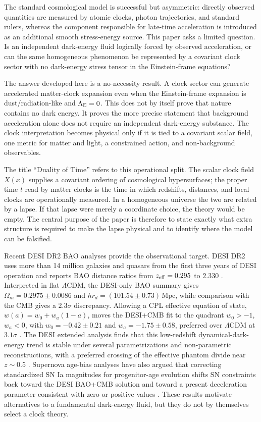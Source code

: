 \documentclass[aps,prd,reprint,nofootinbib,superscriptaddress,longbibliography]{revtex4-2}
\newcommand{\LCDM}{$\Lambda$CDM}
\begin{document}
The standard cosmological model is successful but asymmetric: directly observed quantities are measured by atomic clocks, photon trajectories, and standard rulers, whereas the component responsible for late-time acceleration is introduced as an additional smooth stress-energy source.  This paper asks a limited question.  Is an independent dark-energy fluid logically forced by observed acceleration, or can the same homogeneous phenomenon be represented by a covariant clock sector with no dark-energy stress tensor in the Einstein-frame equations?

The answer developed here is a no-necessity result.  A clock sector can generate accelerated matter-clock expansion even when the Einstein-frame expansion is dust/radiation-like and $\Lambda_{\rm E}=0$.  This does not by itself prove that nature contains no dark energy.  It proves the more precise statement that background acceleration alone does not require an independent dark-energy substance.  The clock interpretation becomes physical only if it is tied to a covariant scalar field, one metric for matter and light, a constrained action, and non-background observables.

The title ``Duality of Time'' refers to this operational split.  The scalar clock field $X(x)$ supplies a covariant ordering of cosmological hypersurfaces; the proper time $t$ read by matter clocks is the time in which redshifts, distances, and local clocks are operationally measured.  In a homogeneous universe the two are related by a lapse.  If that lapse were merely a coordinate choice, the theory would be empty.  The central purpose of the paper is therefore to state exactly what extra structure is required to make the lapse physical and to identify where the model can be falsified.

Recent DESI DR2 BAO analyses provide the observational target.  DESI DR2 uses more than 14 million galaxies and quasars from the first three years of DESI operation and reports BAO distance ratios from $z_{\rm eff}=0.295$ to $2.330$ \cite{DESIDR2}.  Interpreted in flat \LCDM{}, the DESI-only BAO summary gives $\Omega_m=0.2975\pm0.0086$ and $h r_d=(101.54\pm0.73)\,\mathrm{Mpc}$, while comparison with the CMB gives a $2.3\sigma$ discrepancy.  Allowing a CPL effective equation of state, $w(a)=w_0+w_a(1-a)$, moves the DESI+CMB fit to the quadrant $w_0>-1$, $w_a<0$, with $w_0=-0.42\pm0.21$ and $w_a=-1.75\pm0.58$, preferred over \LCDM{} at $3.1\sigma$ \cite{DESIDR2}.  The DESI extended analysis finds that this low-redshift dynamical-dark-energy trend is stable under several parametrizations and non-parametric reconstructions, with a preferred crossing of the effective phantom divide near $z\sim0.5$ \cite{DESIExtended}.  Supernova age-bias analyses have also argued that correcting standardized SN Ia magnitudes for progenitor-age evolution shifts SN constraints back toward the DESI BAO+CMB solution and toward a present deceleration parameter consistent with zero or positive values \cite{Son2025}.  These results motivate alternatives to a fundamental dark-energy fluid, but they do not by themselves select a clock theory. 
\end{document}
